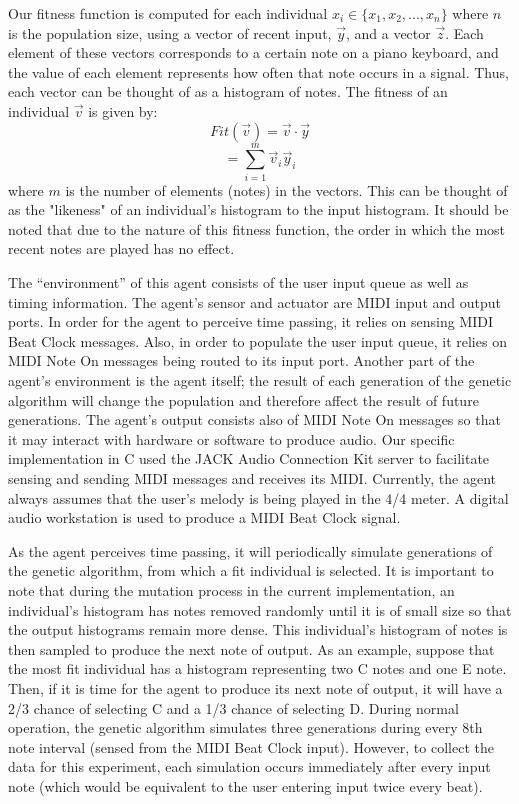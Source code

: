 \documentclass[conference]{IEEEtran}
\begin{document}
Our fitness function is computed for each individual
$x_{i} \in \{x_{1},x_{2},...,x_{n}\} $ where $n$ is the population size, using
a vector of recent input, $\vec{y}$, and a vector $\vec{z}$. Each element of these
vectors corresponds to a certain note on a piano keyboard, and the value of
each element represents how often that note occurs in a signal. Thus, each vector
can be thought of as a histogram of notes. The fitness of an individual $\vec{v}$ is given by:
\[ Fit(\vec{v}) = \vec{v}\cdot\vec{y} \]
\[  = \sum_{i=1}^m \vec{v}_{i}\vec{y}_{i} \]
where $m$ is the number of elements (notes) in the vectors. This can be thought of as the "likeness" of an individual's histogram to
the input histogram. It should be noted that due to the nature of this fitness function, the order in which the most recent notes are played has no effect.

The “environment” of this agent consists of the user input queue as well as timing information. The agent’s sensor and actuator are MIDI input and output ports. In order for the agent to perceive time passing, it relies on sensing MIDI Beat Clock messages. Also, in order to populate the user input queue, it relies on MIDI Note On messages being routed to its input port. Another part of the agent’s environment is the agent itself; the result of each generation of the genetic algorithm will change the population and therefore affect the result of future generations. The agent’s output consists also of MIDI Note On messages so that it may interact with hardware or software to produce audio. Our specific implementation in C used the JACK Audio Connection Kit server to facilitate sensing and sending MIDI messages and receives its MIDI. Currently, the agent always assumes that the user’s melody is being played in the 4/4 meter. A digital audio workstation is used to produce a MIDI Beat Clock signal.

As the agent perceives time passing, it will periodically simulate generations of the genetic algorithm, from which a fit individual is selected. It is important to note that during the mutation process in the current implementation, an individual's histogram has notes removed randomly until it is of small size so that the output histograms remain more dense. This individual’s histogram of notes is then sampled to produce the next note of output. As an example, suppose that the most fit individual has a histogram representing two C notes and one E note. Then, if it is time for the agent to produce its next note of output, it will have a 2/3  chance of selecting C and a 1/3 chance of selecting D.  During normal operation, the genetic algorithm simulates three generations during every 8th note interval (sensed from the MIDI Beat Clock input). However, to collect the data for this experiment, each simulation occurs immediately after every input note (which would be equivalent to the user entering input twice every beat). 
\end{document}
